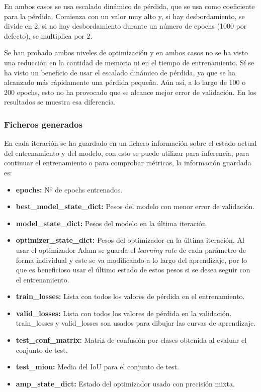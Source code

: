 En ambos casos se usa escalado dinámico de pérdida, que se usa como coeficiente para la pérdida. Comienza con un valor muy alto y, si hay desbordamiento, se divide en 2, si no hay desbordamiento durante un número de epochs (1000 por defecto), se multiplica por 2.

Se han probado ambos niveles de optimización y en ambos casos no se ha visto una reducción en la cantidad de memoria ni en el tiempo de entrenamiento. Sí se ha visto un beneficio de usar el escalado dinámico de pérdida, ya que se ha alcanzado más rápidamente una pérdida pequeña. Aún así, a lo largo de 100 o 200 epochs, esto no ha provocado que se alcance mejor error de validación. En los resultados se muestra esa diferencia.

\subsubsection{Ficheros generados}
En cada iteración se ha guardado en un fichero información sobre el estado actual del entrenamiento y del modelo, con esto se puede utilizar para inferencia, para continuar el entrenamiento o para comprobar métricas, la información guardada es:
\begin{itemize}
\item \textbf{epochs:} Nº de epochs entrenados.
\item \textbf{best\_model\_state\_dict:} Pesos del modelo con menor error de validación.
\item \textbf{model\_state\_dict:} Pesos del modelo en la última iteración.
\item \textbf{optimizer\_state\_dict:} Pesos del optimizador en la última iteración. Al usar el optimizador Adam se guarda el \textit{learning rate} de cada parámetro de forma individual y este se va modificando a lo largo del aprendizaje, por lo que es beneficioso usar el último estado de estos pesos si se desea seguir con el entrenamiento.
\item \textbf{train\_losses:} Lista con todos los valores de pérdida en el entrenamiento.
\item \textbf{valid\_losses:} Lista con todos los valores de pérdida en la validación. train\_losses y valid\_losses son usados para dibujar las curvas de aprendizaje.
\item \textbf{test\_conf\_matrix:} Matriz de confusión por clases obtenida al evaluar el conjunto de test.
\item \textbf{test\_miou:} Media del IoU para el conjunto de test.
\item \textbf{amp\_state\_dict:} Estado del optimizador usado con precisión mixta.
\end{itemize}

